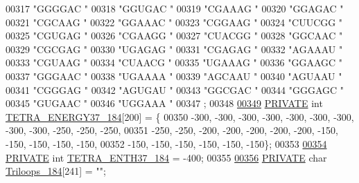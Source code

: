 \begin{DoxyCode}
00317   \textcolor{stringliteral}{"GGGGAC "}
00318   \textcolor{stringliteral}{"GGUGAC "}
00319   \textcolor{stringliteral}{"CGAAAG "}
00320   \textcolor{stringliteral}{"GGAGAC "}
00321   \textcolor{stringliteral}{"CGCAAG "}
00322   \textcolor{stringliteral}{"GGAAAC "}
00323   \textcolor{stringliteral}{"CGGAAG "}
00324   \textcolor{stringliteral}{"CUUCGG "}
00325   \textcolor{stringliteral}{"CGUGAG "}
00326   \textcolor{stringliteral}{"CGAAGG "}
00327   \textcolor{stringliteral}{"CUACGG "}
00328   \textcolor{stringliteral}{"GGCAAC "}
00329   \textcolor{stringliteral}{"CGCGAG "}
00330   \textcolor{stringliteral}{"UGAGAG "}
00331   \textcolor{stringliteral}{"CGAGAG "}
00332   \textcolor{stringliteral}{"AGAAAU "}
00333   \textcolor{stringliteral}{"CGUAAG "}
00334   \textcolor{stringliteral}{"CUAACG "}
00335   \textcolor{stringliteral}{"UGAAAG "}
00336   \textcolor{stringliteral}{"GGAAGC "}
00337   \textcolor{stringliteral}{"GGGAAC "}
00338   \textcolor{stringliteral}{"UGAAAA "}
00339   \textcolor{stringliteral}{"AGCAAU "}
00340   \textcolor{stringliteral}{"AGUAAU "}
00341   \textcolor{stringliteral}{"CGGGAG "}
00342   \textcolor{stringliteral}{"AGUGAU "}
00343   \textcolor{stringliteral}{"GGCGAC "}
00344   \textcolor{stringliteral}{"GGGAGC "}
00345   \textcolor{stringliteral}{"GUGAAC "}
00346   \textcolor{stringliteral}{"UGGAAA "}
00347 ;
00348 
\mbox{\hyperlink{1_88_84__epars_8h_ac421cb01d511bad0a9a7869117332a54}{00349}} \mbox{\hyperlink{edit__cost_8h_a5e151c615eda34903514212f05a5ccf8}{PRIVATE}} \textcolor{keywordtype}{int}   \mbox{\hyperlink{1_88_84__epars_8h_ac421cb01d511bad0a9a7869117332a54}{TETRA\_ENERGY37\_184}}[200] = \{
00350   -300, -300, -300, -300, -300, -300, -300, -300, -300, -250, -250, -250,
00351   -250, -250, -200, -200, -200, -200, -200, -150, -150, -150, -150, -150,
00352   -150, -150, -150, -150, -150, -150\};
00353 
\mbox{\hyperlink{1_88_84__epars_8h_af2e0d0e21e5a4a917de202825af89bb9}{00354}} \mbox{\hyperlink{edit__cost_8h_a5e151c615eda34903514212f05a5ccf8}{PRIVATE}} \textcolor{keywordtype}{int}   \mbox{\hyperlink{1_88_84__epars_8h_af2e0d0e21e5a4a917de202825af89bb9}{TETRA\_ENTH37\_184}}   = -400;
00355 
\mbox{\hyperlink{1_88_84__epars_8h_af76b33439c0facb3182d4ab96efe0e0e}{00356}} \mbox{\hyperlink{edit__cost_8h_a5e151c615eda34903514212f05a5ccf8}{PRIVATE}} \textcolor{keywordtype}{char} \mbox{\hyperlink{1_88_84__epars_8h_af76b33439c0facb3182d4ab96efe0e0e}{Triloops\_184}}[241] = \textcolor{stringliteral}{""};

\end{DoxyCode}
